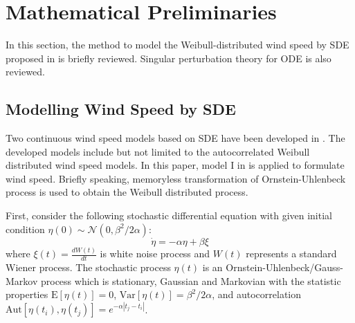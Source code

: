 \documentclass[journal]{IEEEtran}
\begin{document}
\section{Mathematical Preliminaries}\label{mathprelim}
In this section, the method to model the Weibull-distributed wind speed by SDE proposed in \cite{Milano:2013_1}\cite{Milano:2013} is briefly reviewed. Singular perturbation theory for ODE \cite{Khalil:book} is also reviewed. \subsection{Modelling Wind Speed by SDE}\label{subsection modelling wind by SDE}
Two continuous wind speed models based on SDE have been developed in \cite{Milano:2013_1}\cite{Milano:2013}. The developed models include but not limited to the autocorrelated Weibull distributed wind speed models.
In this paper, model I in \cite{Milano:2013_1} is applied to formulate wind speed. Briefly speaking, memoryless transformation of Ornstein-Uhlenbeck process is used to obtain the Weibull distributed process.

First, consider the following stochastic differential equation with given initial condition $\eta(0)\sim\mathcal{N}(0,\beta^2/2\alpha)$:
\begin{equation}\label{windsde}
\dot{\eta}=-\alpha \eta+\beta\xi \end{equation}
where $\xi(t)=\frac{dW(t)}{dt}$ is white noise process and $W(t)$ represents a standard Wiener process. The stochastic process $\eta(t)$ is an Ornstein-Uhlenbeck/Gauss-Markov process which is stationary, Gaussian and Markovian with the statistic properties $ \mathrm{E}[\eta(t)]=0$, $\mathrm{Var}[\eta(t)]=\beta^2/2\alpha$, and autocorrelation $\mathrm{Aut}[\eta(t_i),\eta(t_j)]=e^{-\alpha|t_j-t_i|}$.
\end{document}
